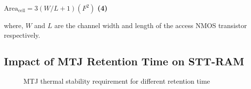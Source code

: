  {
 \small{
 \hspace{55mm} $\mathrm{Area}_{\mathrm{cell}}={3\left(W/L+1\right)}(F^2)$ \hspace{3mm} \textbf{(4)}
 }
 }

where, $W$ and $L$ are the channel width and length of the access NMOS transistor respectively.

\subsection{Impact of MTJ Retention Time on STT-RAM} \label{subsec:retention}

\begin{wrapfigure}{l}{0.50\textwidth}
\centering
  \caption{\label{fig:retention} MTJ thermal stability requirement for different retention time}
\end{wrapfigure}

